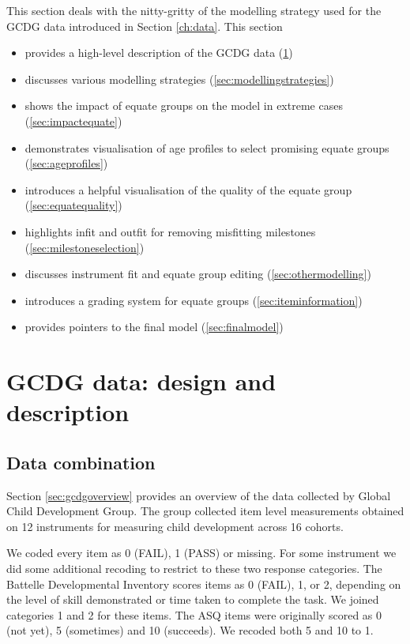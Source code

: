 \documentclass[
]{book}
\providecommand{\tightlist}{%
  \setlength{\itemsep}{0pt}\setlength{\parskip}{0pt}}
\begin{document}
This section deals with the nitty-gritty of the modelling strategy used for the GCDG data introduced in Section \ref{ch:data}. This section

\begin{itemize}
\tightlist
\item
  provides a high-level description of the GCDG data (\ref{sec:gcdgdata})
\item
  discusses various modelling strategies (\ref{sec:modellingstrategies})
\item
  shows the impact of equate groups on the model in extreme cases (\ref{sec:impactequate})
\item
  demonstrates visualisation of age profiles to select promising equate groups (\ref{sec:ageprofiles})
\item
  introduces a helpful visualisation of the quality of the equate group (\ref{sec:equatequality})
\item
  highlights infit and outfit for removing misfitting milestones (\ref{sec:milestoneselection})
\item
  discusses instrument fit and equate group editing (\ref{sec:othermodelling})
\item
  introduces a grading system for equate groups (\ref{sec:iteminformation})
\item
  provides pointers to the final model (\ref{sec:finalmodel})
\end{itemize}

\hypertarget{sec:gcdgdata}{%
\section{GCDG data: design and description}\label{sec:gcdgdata}}

\hypertarget{data-combination}{%
\subsection{Data combination}\label{data-combination}}

Section \ref{sec:gcdgoverview} provides an overview of the data collected by Global Child Development Group. The group collected item level measurements obtained on 12 instruments for measuring child development across 16 cohorts.

We coded every item as 0 (FAIL), 1 (PASS) or missing. For some instrument we did some additional recoding to restrict to these two response categories. The Battelle Developmental Inventory scores items as 0 (FAIL), 1, or 2, depending on the level of skill demonstrated or time taken to complete the task. We joined categories 1 and 2 for these items. The ASQ items were originally scored as 0 (not yet), 5 (sometimes) and 10 (succeeds). We recoded both 5 and 10 to 1.
\end{document}

